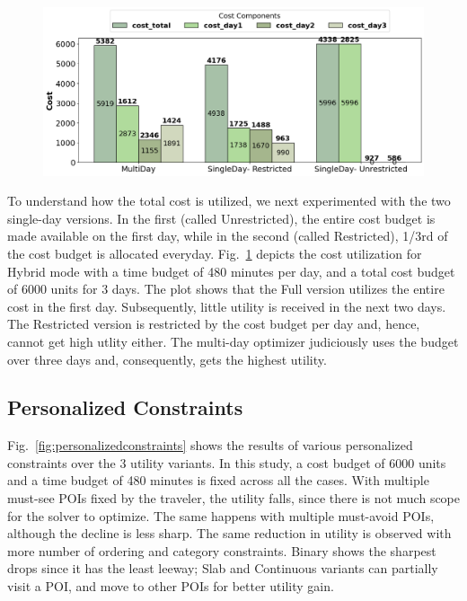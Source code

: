 \begin{figure}[t]
\centering
\includegraphics[width=\figwidth]{plots/costbreakdown.png}
\label{fig:multi-day-cost-breakdown}
\end{figure}

To understand how the total cost is utilized, we next experimented with the two single-day versions. In the first (called Unrestricted), the entire cost budget is made available on the first day, while in the second (called Restricted), 1/3rd of the cost budget is allocated everyday.
Fig.~\ref{fig:multi-day-cost-breakdown} depicts the cost utilization for Hybrid mode with a time budget of 480 minutes per day, and a total cost budget of 6000 units for 3 days. The plot shows that the Full version utilizes the entire cost in the first day. Subsequently, little utility is received in the next two days.
The Restricted version is restricted by the cost budget per day and, hence, cannot get high utlity either.
The \trip multi-day optimizer judiciously uses the budget over three days and, consequently, gets the highest utility.

\subsection{Personalized Constraints}

Fig.~\ref{fig:personalizedconstraints} shows the results of various personalized constraints over the 3 utility variants.
In this study, a cost budget of 6000 units and a time budget of 480 minutes is fixed across all the cases.
With multiple must-see POIs fixed by the traveler, the utility falls, since there is not much scope for the solver to optimize. The same happens with multiple must-avoid POIs, although the decline is less sharp.
The same reduction in utility is observed with more number of ordering and category constraints.
Binary shows the sharpest drops since it has the least leeway; Slab and Continuous variants can partially visit a POI, and move to other POIs for better utility gain.

